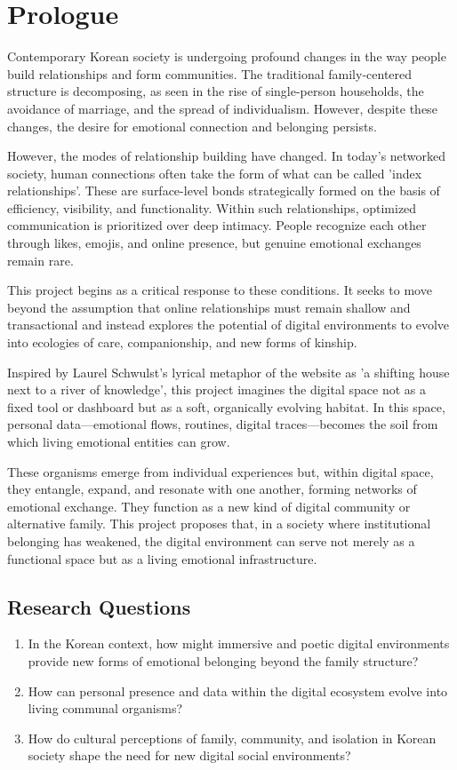 \chapter{Prologue}

Contemporary Korean society is undergoing profound changes in the way people build relationships and form communities. The traditional family-centered structure is decomposing, as seen in the rise of single-person households, the avoidance of marriage, and the spread of individualism. However, despite these changes, the desire for emotional connection and belonging persists.

However, the modes of relationship building have changed. In today’s networked society, human connections often take the form of what can be called 'index relationships'. These are surface-level bonds strategically formed on the basis of efficiency, visibility, and functionality. Within such relationships, optimized communication is prioritized over deep intimacy. People recognize each other through likes, emojis, and online presence, but genuine emotional exchanges remain rare.

This project begins as a critical response to these conditions. It seeks to move beyond the assumption that online relationships must remain shallow and transactional and instead explores the potential of digital environments to evolve into ecologies of care, companionship, and new forms of kinship.

Inspired by Laurel Schwulst’s lyrical metaphor of the website as 'a shifting house next to a river of knowledge', this project imagines the digital space not as a fixed tool or dashboard but as a soft, organically evolving habitat. In this space, personal data—emotional flows, routines, digital traces—becomes the soil from which living emotional entities can grow.

These organisms emerge from individual experiences but, within digital space, they entangle, expand, and resonate with one another, forming networks of emotional exchange. They function as a new kind of digital community or alternative family. This project proposes that, in a society where institutional belonging has weakened, the digital environment can serve not merely as a functional space but as a living emotional infrastructure.

\cleardoublepage

\section{Research Questions}
\begin{enumerate}
    \item In the Korean context, how might immersive and poetic digital environments provide new forms of emotional belonging beyond the family structure?
    \item How can personal presence and data within the digital ecosystem evolve into living communal organisms?
    \item How do cultural perceptions of family, community, and isolation in Korean society shape the need for new digital social environments?
\end{enumerate}




